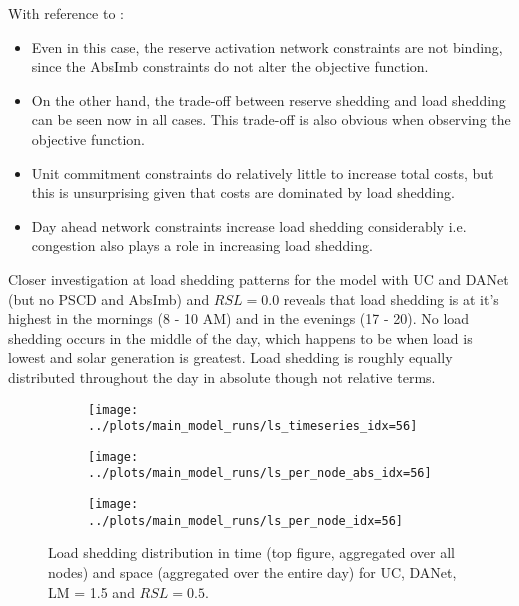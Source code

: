 \documentclass[number,times]{elsarticle}
\begin{document}

With reference to :

\begin{itemize}
    \item Even in this case, the reserve activation network constraints are not binding, since the AbsImb constraints do not alter the objective function.
    \item On the other hand, the trade-off between reserve shedding and load shedding can be seen now in all cases. This trade-off is also obvious when observing the objective function.
    \item Unit commitment constraints do relatively little to increase total costs, but this is unsurprising given that costs are dominated by load shedding.
    \item Day ahead network constraints increase load shedding considerably i.e. congestion also plays a role in increasing load shedding.
\end{itemize}

Closer investigation at load shedding patterns for the model with UC and DANet (but no PSCD and AbsImb) and $RSL = 0.0$ reveals that load shedding is at it's highest in the mornings (8 - 10 AM) and in the evenings (17 - 20). No load shedding occurs in the middle of the day, which happens to be when load is lowest and solar generation is greatest. Load shedding is roughly equally distributed throughout the day in absolute though not relative terms.

\begin{figure}[H]
    \centering
    \begin{subfigure}[t]{0.45\textwidth}
        \centering
        \texttt{[image: ../plots/main\_model\_runs/ls\_timeseries\_idx=56]}
        \caption{}
    \end{subfigure}
    \newline
    \begin{subfigure}[t]{0.45\textwidth}
        \centering
        \texttt{[image: ../plots/main\_model\_runs/ls\_per\_node\_abs\_idx=56]}
        \caption{}
    \end{subfigure}
    \begin{subfigure}[t]{0.45\textwidth}
        \centering
        \texttt{[image: ../plots/main\_model\_runs/ls\_per\_node\_idx=56]}
        \caption{}
    \end{subfigure}
    \caption{Load shedding distribution in time (top figure, aggregated over all nodes) and space (aggregated over the entire day) for UC, DANet, LM = 1.5 and $RSL = 0.5$.}
\end{figure}
\end{document}
